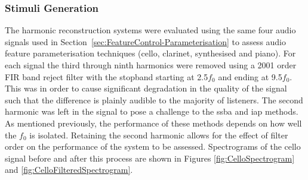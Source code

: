 		\subsubsection*{Stimuli Generation}
			The harmonic reconstruction systems were evaluated using the same four audio signals used in
			Section~\ref{sec:FeatureControl-Parameterisation} to assess audio feature parameterisation
			techniques (cello, clarinet, synthesised and piano). For each signal the third through ninth
			harmonics were removed using a 2001 order FIR band reject filter with the stopband
			starting at 2.5$f_{0}$ and ending at 9.5$f_{0}$. This was in order to cause significant degradation
			in the quality of the signal such that the difference is plainly audible to the majority of
			listeners. The second harmonic was left in the signal to pose a challenge to the \acrshort{ssba}
			and \acrshort{iap} methods. As mentioned previously, the performance of these methods depends on
			how well the $f_{0}$ is isolated.  Retaining the second harmonic allows for the effect of filter
			order on the performance of the system to be assessed. Spectrograms of the cello signal before and
			after this process are shown in Figures \ref{fig:CelloSpectrogram} and
			\ref{fig:CelloFilteredSpectrogram}. 

